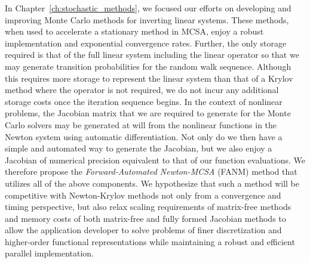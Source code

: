 In Chapter~\ref{ch:stochastic_methods}, we focused our efforts on
developing and improving Monte Carlo methods for inverting linear
systems. These methods, when used to accelerate a stationary method in
MCSA, enjoy a robust implementation and exponential convergence
rates. Further, the only storage required is that of the full linear
system including the linear operator so that we may generate
transition probabilities for the random walk sequence. Although this
requires more storage to represent the linear system than that of a
Krylov method where the operator is not required, we do not incur any
additional storage costs once the iteration sequence begins. In the
context of nonlinear problems, the Jacobian matrix that we are
required to generate for the Monte Carlo solvers may be generated at
will from the nonlinear functions in the Newton system using automatic
differentiation. Not only do we then have a simple and automated way to
generate the Jacobian, but we also enjoy a Jacobian of numerical
precision equivalent to that of our function evaluations. We therefore
propose the \textit{Forward-Automated Newton-MCSA} (FANM) method that
utilizes all of the above components. We hypothesize that such a
method will be competitive with Newton-Krylov methods not only from a
convergence and timing perspective, but also relax scaling
requirements of matrix-free methods and memory costs of both
matrix-free and fully formed Jacobian methods to allow the application
developer to solve problems of finer discretization and higher-order
functional representations while maintaining a robust and efficient
parallel implementation.

